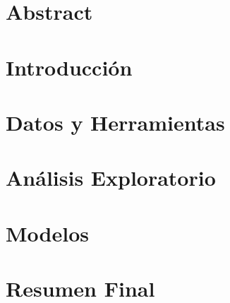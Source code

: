 \documentclass[11pt,a4paper]{especializacion}
\begin{document}

\def\autor{Ignacio José Chiapella}
\def\tituloTesis{Análisis de precios en productos de góndola: \vspace{.2cm} \\ Ciudad de Buenos Aires}
\def\runtitulo{Análisis de precios en productos de góndola: \vspace{.2cm} \\ Ciudad de Buenos Aires}
\def\director{Ricardo Maronna }
\def\lugar{Buenos Aires, 2021}



\tableofcontents

\chapter{Abstract}


\chapter{Introducción}


\chapter{Datos y Herramientas}


\chapter{Análisis Exploratorio}


\chapter{Modelos}


\chapter{Resumen Final}


%

\printbibliography
\end{document}
